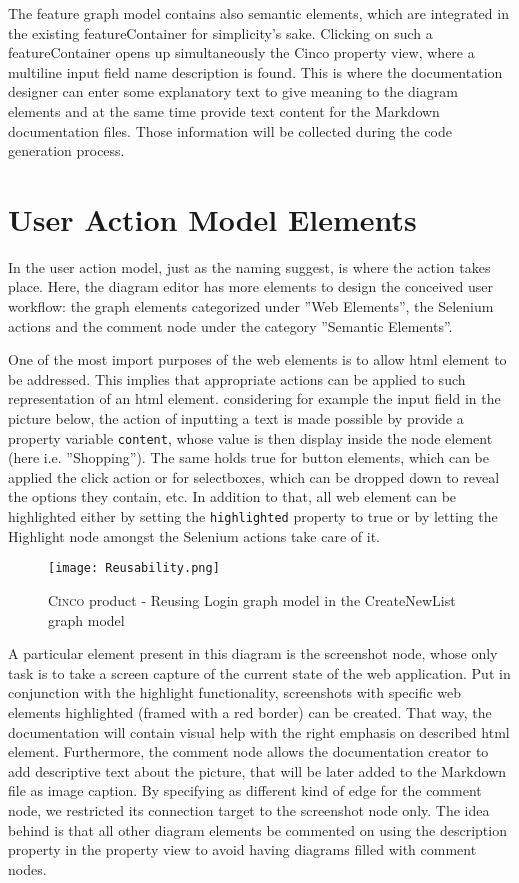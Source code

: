 The feature graph model contains also semantic elements, which are integrated in the existing featureContainer for simplicity's sake. Clicking on such a featureContainer opens up simultaneously the Cinco property view, where a multiline input field name description is found. This is where the documentation designer can enter some explanatory text to give meaning to the diagram elements and at the same time provide text content for the Markdown documentation files. Those information will be collected during the code generation process.

\section{User Action Model Elements}\label{sec:DocModElem}
In the user action model, just as the naming suggest, is where the action takes place. Here, the diagram editor has more elements to design the conceived user workflow: the graph elements categorized under ''Web Elements'', the Selenium actions and the comment node under the category ''Semantic Elements''.

One of the most import purposes of the web elements is to allow \acrshort{html} element to be addressed. This implies that appropriate actions can be applied to such representation of an \acrshort{html} element. considering for example the input field in the picture below, the action of inputting a text is made possible by provide a property variable \lstinline{content}, whose value is then display inside the node element (here i.e. ''Shopping''). The same holds true for button elements, which can be applied the click action or for selectboxes, which can be dropped down to reveal the options they contain, etc. In addition to that, all web element can be highlighted either by setting the \lstinline{highlighted} property to true or by letting the Highlight node amongst the Selenium actions take care of it.

\begin{figure}[h]
    \centering
    \texttt{[image: Reusability.png]}
    \caption{\textsc{Cinco} product - Reusing Login graph model in the CreateNewList graph model}
    \label{fig:reusability}
\end{figure}

A particular element present in this diagram is the screenshot node, whose only task is to take a screen capture of the current state of the web application. Put in conjunction with the highlight functionality, screenshots with specific web elements highlighted (framed with a red border) can be created. That way, the documentation will contain visual help with the right emphasis on described \acrshort{html} element. Furthermore, the comment node allows the documentation creator to add descriptive text about the picture, that will be later added to the Markdown file as image caption. By specifying as different kind of edge for the comment node, we restricted its connection target to the screenshot node only. The idea behind is that all other diagram elements be commented on using the description property in the property view to avoid having diagrams filled with comment nodes.

